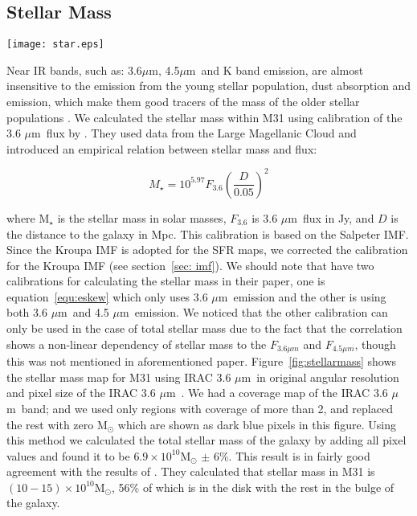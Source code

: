 \documentclass[useAMS,usenatbib]{mn2e}
\newcommand \um    {$\mu$m\ }
\begin{document}
\subsection{Stellar Mass}
\label{sec:starmass}
\begin{figure*}
\centering
\texttt{[image: star.eps]}
\caption{The stellar surface density map is produced using IRAC 3.6~$\mu$m data and its calibration is presented in equation~\ref{equ:eskew}.}
\label{fig:stellarmass}
\end{figure*}

Near IR bands, such as: 3.6$\mu$m, 4.5\um and K band emission, are almost insensitive to the emission from the young stellar population, dust absorption and emission, which make them good tracers of the mass of the older stellar populations \citep[e.g.][]{Elmgreen84, Eskew12, Zhu10}. We calculated the stellar mass within M31 using calibration of the 3.6 \um flux by \cite{Eskew12}. They used data from the Large Magellanic Cloud and introduced an empirical relation between stellar mass and flux:

\begin{equation}
\label{equ:eskew}
M _{\star}= 10^{5.97} F_{3.6}\left(\frac{D}{0.05}\right)^2
\end{equation}

\noindent where M$_{\star}$ is the stellar mass in solar masses, $F_{3.6}$ is 3.6 \um flux in Jy, and $D$ is the distance to the galaxy in Mpc. This calibration is based on the Salpeter \cite{Salpeter55} IMF. Since the Kroupa IMF is adopted for the SFR maps, we corrected the calibration for the Kroupa IMF (see section~\ref{sec: imf}). We should note that \cite{Eskew12} have two calibrations for calculating the stellar mass in their paper, one is equation~\ref{equ:eskew} which only uses 3.6 \um emission and the other is using both 3.6 \um and 4.5 \um emission. We noticed that the other calibration can only be used in the case of total stellar mass due to the fact that the correlation shows a non-linear dependency of stellar mass to the $F_{3.6 \mu m}$ and $F_{4.5 \mu m}$, though this was not mentioned in aforementioned paper. 
Figure~\ref{fig:stellarmass} shows the stellar mass map for M31 using IRAC 3.6 \um in original angular resolution and pixel size of the IRAC 3.6 \um. We had a coverage map of the IRAC 3.6 \um band; and we used only regions with coverage of more than 2, and replaced the rest with zero M$_{\odot}$ which are shown as dark blue pixels in this figure. 
Using this method we calculated the total stellar mass of the galaxy by adding all pixel values and found it to be $6.9 \times 10^{10}$M$_{\odot}$ $\pm$ 6$\%$. This result is in fairly good agreement with the results of \cite{Tamm12}. They calculated that stellar mass in M31 is $(10-15) \times 10^{10}$M$_{\odot}$, 56$\%$ of which is in the disk with the rest in the bulge of the galaxy.
\end{document}
